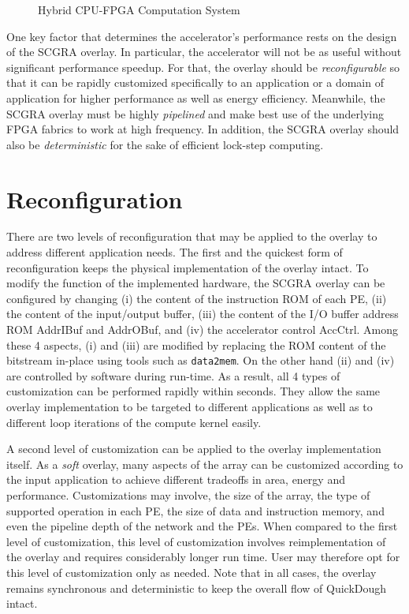 \begin{figure}
\centering
{}
\hfill
{}
\caption{Hybrid CPU-FPGA Computation System}
\label{fig:FPGA-accelerator}
\end{figure}

One key factor that determines the accelerator's performance rests on the design of the SCGRA overlay. In particular, the accelerator will not be as useful without significant performance speedup. For that, the overlay should be \emph{reconfigurable} so that it can be rapidly customized specifically to an application or a domain of application for higher performance as well as energy efficiency. Meanwhile, the SCGRA overlay must be highly \emph{pipelined} and make best use of the underlying FPGA fabrics to work at high frequency. In addition, the SCGRA overlay should also be \emph{deterministic} for the sake of efficient lock-step computing. 

\section{Reconfiguration}
There are two levels of reconfiguration that may be applied to the overlay to address different application needs. The first and the quickest form of reconfiguration keeps the physical implementation of the overlay intact. To modify the function of the implemented hardware, the SCGRA overlay can be configured by changing (i) the content of the instruction ROM of each PE, (ii) the content of the input/output buffer, (iii) the content of the I/O buffer address ROM AddrIBuf and AddrOBuf, and (iv) the accelerator control AccCtrl.  Among these 4 aspects, (i) and (iii) are modified by replacing the ROM content of the bitstream in-place using tools such as \texttt{data2mem}. On the other hand (ii) and (iv) are controlled by software during run-time.  As a result, all 4 types of customization can be performed rapidly within seconds. They allow the same overlay implementation to be targeted to different applications as well as to different loop iterations of the compute kernel easily.

A second level of customization can be applied to the overlay implementation itself. As a \emph{soft} overlay, many aspects of the array can be customized according to the input application to achieve different tradeoffs in area, energy and performance. Customizations may involve, the size of the array, the type of supported operation in each PE, the size of data and instruction memory, and even the pipeline depth of the network and the PEs. When compared to the first level of customization, this level of customization involves reimplementation of the overlay and requires considerably longer run time. User may therefore opt for this level of customization only as needed. Note that in all cases, the overlay remains synchronous and deterministic to keep the overall flow of QuickDough intact.

